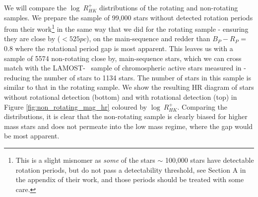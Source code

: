 
We will compare the $\log \ R^{+}_{HK}$ distributions of the \citet{mcquillan_rotation_2014} rotating and non-rotating samples.
We prepare the sample of 99,000 stars without detected rotation periods from their work\footnote{This is a slight misnomer as \textit{some} of the stars $\sim$ 100,000 stars have detectable rotation periods, but do not pass a detectability threshold, see Section A in the appendix of their work, and those periods should be treated with some care.} in the same way that we did for the rotating sample - ensuring they are close by ($<525 pc$), on the main-sequence and redder than $B_P-R_P$ = 0.8 where the rotational period gap is most apparent.
This leaves us with a sample of 5574 non-rotating close by, main-sequence stars, which we can cross match with the LAMOST-\kepler{} \ sample of chromospheric active stars measured in \citet{zhang_magnetic_2020} - reducing the number of stars to 1134 stars.
The number of stars in this sample is similar to that in the rotating sample.
We show the resulting HR diagram of stars without rotational detection (bottom) and with rotational detection (top) in Figure \ref{fig:non_rotating_mag_hr} coloured by $\log \ R^{+}_{HK}$.
Comparing the distributions, it is clear that the non-rotating sample is clearly biased for higher mass stars and does not permeate into the low mass regime, where the gap would be most apparent.

